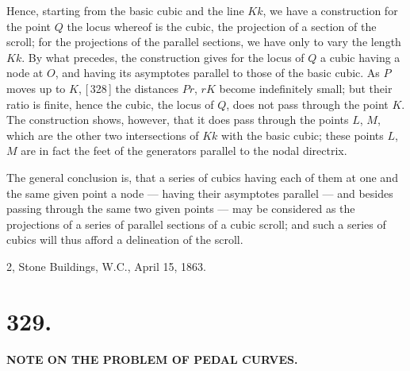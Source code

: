 \documentclass[11pt,a4paper]{article}
\begin{document}
Hence, starting from the basic cubic and the line $Kk$, we have a construction for the point $Q$ the locus whereof is the cubic, the projection of a section of the scroll; for the projections of the parallel sections, we have only to vary the length $Kk$. By what precedes, the construction gives for the locus of $Q$ a cubic having a node at $O$, and having its asymptotes parallel to those of the basic cubic. As $P$ moves up to $K$, [\,328\,] the distances $Pr$, $rK$ become indefinitely small; but their ratio is finite, hence the cubic, the locus of $Q$, does not pass through the point $K$. The construction shows, however, that it does pass through the points $L$, $M$, which are the other two intersections of $Kk$ with the basic cubic; these points $L$, $M$ are in fact the feet of the generators parallel to the nodal directrix.

The general conclusion is, that a series of cubics having each of them at one and the same given point a node --- having their asymptotes parallel --- and besides passing through the same two given points --- may be considered as the projections of a series of parallel sections of a cubic scroll; and such a series of cubics will thus afford a delineation of the scroll.

\begin{flushright}
2, Stone Buildings, W.C., April 15, 1863.
\end{flushright}


\newpage
\section*{329.}

\begin{center}
\textbf{NOTE ON THE PROBLEM OF PEDAL CURVES.}
\end{center}


\bigskip
\end{document}

